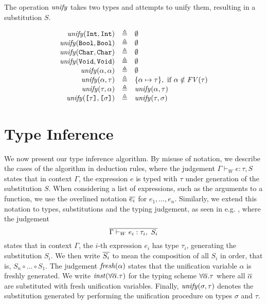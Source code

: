 The operation $\mathit{unify}$ takes two types and attempts to unify them, resulting in
a substitution $S$.

\[
\begin{array}{rcl}
  \mathit{unify}(\texttt{Int},\texttt{Int}) & \triangleq & \emptyset \\
  \mathit{unify}(\texttt{Bool},\texttt{Bool}) & \triangleq & \emptyset \\
  \mathit{unify}(\texttt{Char},\texttt{Char}) & \triangleq & \emptyset \\
  \mathit{unify}(\texttt{Void},\texttt{Void}) & \triangleq & \emptyset \\
  \mathit{unify}(\alpha,\alpha) & \triangleq & \emptyset \\
  \mathit{unify}(\alpha,\tau) & \triangleq &
    \{ \alpha \mapsto \tau \},\ \text{if}\ \alpha \notin \mathit{FV}(\tau) \\
  \mathit{unify}(\tau,\alpha) & \triangleq & \mathit{unify}(\alpha,\tau) \\
  \mathit{unify}(\texttt{[}\tau\texttt{]},\texttt{[}\sigma\texttt{]}) & \triangleq & \mathit{unify}(\tau,\sigma)
\end{array}
\]


\section{Type Inference}

We now present our type inference algorithm. By misuse of notation, we describe
the cases of the algorithm in deduction rules, where the judgement
$\Gamma \vdash_W e : \tau, S$ states that in context $\Gamma$, the expression $e$
is typed with $\tau$ under generation of the substitution $S$.
When considering a list of expressions, such as the arguments to a function, we
use the overlined notation $\overline{e_i}$ for $e_1,\dots,e_n$. Similarly, we
extend this notation to types, substitutions and the typing judgement, as seen
in e.g. , where the judgement
\[ \overline{ \Gamma \vdash_W e_i : \tau_i,\ S_i } \]
states that in context $\Gamma$, the $i$-th expression $e_i$ has type $\tau_i$,
generating the substitution $S_i$. We then write $\overline{S_i}$ to mean the
composition of all $S_i$ in order, that is, $S_n \circ \dots \circ S_1$.
The judgement $\mathit{fresh}(\alpha)$ states that the unification variable $\alpha$ is
freshly generated. We write $\mathit{inst}(\forall \overline{\alpha}. \tau)$ for the
typing scheme $\forall \overline{\alpha}. \tau$ where all $\overline{\alpha}$ are
substituted with fresh unification variables.
Finally, $\mathit{unify}(\sigma,\tau)$ denotes the substitution generated by performing
the unification procedure on types $\sigma$ and $\tau$.

